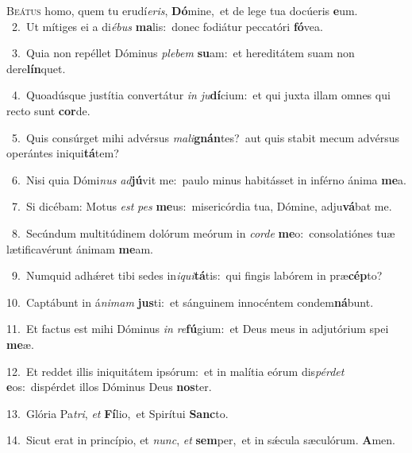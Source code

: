 \lettrine{\initial\textcolor{\initialcolor}{B}}{eátus} homo, quem tu erudí\-\textit{e}\-\textit{ris}, \textbf{Dó}\-mine,~\star et de lege tua docúeris \textbf{e}\-um.\\
{\numbfont\textcolor{\numbcolor}{~2.}}~Ut mítiges ei a di\-\textit{é}\-\textit{bus} \textbf{ma}\-lis:~\star donec fodiátur peccatóri \textbf{fó}\-vea.\par
{\numbfont\textcolor{\numbcolor}{~3.}}~Quia non repéllet Dóminus \textit{ple}\-\textit{bem} \textbf{su}\-am:~\star et hereditátem suam non dere\-\textbf{lín}\-quet.\par
{\numbfont\textcolor{\numbcolor}{~4.}}~Quoadúsque justítia convertátur \textit{in} \textit{ju}\-\textbf{dí}cium:~\star et qui juxta illam omnes qui recto sunt \textbf{cor}\-de.\par
{\numbfont\textcolor{\numbcolor}{~5.}}~Quis consúrget mihi advérsus \textit{ma}\-\textit{li}\textbf{gnán}tes?~\star aut quis stabit mecum advérsus operántes iniqui\-\textbf{tá}\-tem?\par
{\numbfont\textcolor{\numbcolor}{~6.}}~Nisi quia Dómi\textit{nus} \textit{ad}\-\textbf{jú}vit me:~\star paulo minus habitásset in inférno ánima \textbf{me}\-a.\par
{\numbfont\textcolor{\numbcolor}{~7.}}~Si dicébam: Motus \textit{est} \textit{pes} \textbf{me}\-us:~\star misericórdia tua, Dómine, adju\-\textbf{vá}\-bat me.\par
{\numbfont\textcolor{\numbcolor}{~8.}}~Secúndum multitúdinem dolórum meórum in \textit{cor}\-\textit{de} \textbf{me}\-o:~\star consolatiónes tuæ lætificavérunt ánimam \textbf{me}\-am.\par
{\numbfont\textcolor{\numbcolor}{~9.}}~Numquid adhǽret tibi sedes in\-\textit{i}\-\textit{qui}\textbf{tá}tis:~\star qui fingis labórem in præ\-\textbf{cép}\-to?\par
{\numbfont\textcolor{\numbcolor}{10.}}~Captábunt in á\-\textit{ni}\-\textit{mam} \textbf{jus}\-ti:~\star et sánguinem innocéntem condem\-\textbf{ná}\-bunt.\par
{\numbfont\textcolor{\numbcolor}{11.}}~Et factus est mihi Dóminus \textit{in} \textit{re}\-\textbf{fú}gium:~\star et Deus meus in adjutórium spei \textbf{me}\-æ.\par
{\numbfont\textcolor{\numbcolor}{12.}}~Et reddet illis iniquitátem ipsórum:~\dagger et in malítia eórum dis\-\textit{pér}\-\textit{det} \textbf{e}\-os:~\star dispérdet illos Dóminus Deus \textbf{nos}\-ter.\par
{\numbfont\textcolor{\numbcolor}{13.}}~Glória Pa\-\textit{tri}\-, \textit{et} \textbf{Fí}\-lio,~\star et Spirítui \textbf{Sanc}\-to.\par
{\numbfont\textcolor{\numbcolor}{14.}}~Sicut erat in princípio, et \textit{nunc}\-, \textit{et} \textbf{sem}\-per,~\star et in sǽcula sæculórum. \textbf{A}\-men.\par
